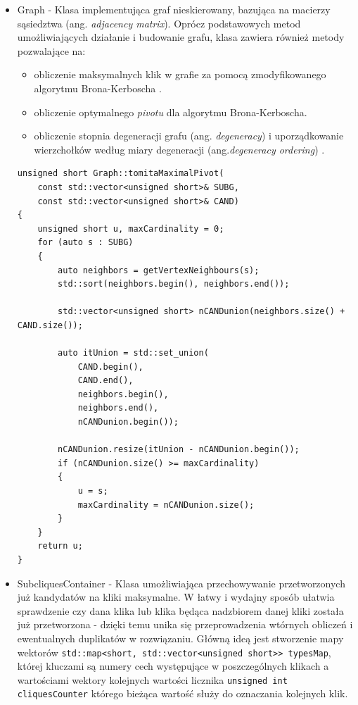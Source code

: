 \documentclass[12pt]{article}
\def\inline{\lstinline[basicstyle=\ttfamily,keywordstyle={}]}
\begin{document}
\begin{itemize}
\item Graph - Klasa implementująca graf nieskierowany, bazująca na macierzy sąsiedztwa (ang. \textit{adjacency matrix}). Oprócz podstawowych metod umożliwiających działanie i budowanie grafu, klasa zawiera również metody pozwalające na:

\begin{itemize}
\item obliczenie maksymalnych klik w grafie za pomocą zmodyfikowanego algorytmu Brona-Kerboscha \cite{chinczyki}.
\item obliczenie optymalnego \textit{pivotu} \cite{pivot} dla algorytmu Brona-Kerboscha.
\item obliczenie stopnia degeneracji grafu (ang. \textit{degeneracy}) i uporządkowanie wierzchołków według miary degeneracji (ang.\textit{degeneracy ordering}) \cite{degenerat}.
\end{itemize}

\begin{minipage}{\linewidth}
\begin{lstlisting}[caption={Kod metody tomitaMaximalPivot umożliwiającej wyliczenie optymalnego punktu \textit{pivot}}]
unsigned short Graph::tomitaMaximalPivot(
	const std::vector<unsigned short>& SUBG,
    const std::vector<unsigned short>& CAND)
{
	unsigned short u, maxCardinality = 0;
	for (auto s : SUBG)
	{
		auto neighbors = getVertexNeighbours(s);
		std::sort(neighbors.begin(), neighbors.end());

		std::vector<unsigned short> nCANDunion(neighbors.size() + CAND.size());

		auto itUnion = std::set_union(
        	CAND.begin(),
            CAND.end(),
            neighbors.begin(),
            neighbors.end(),
            nCANDunion.begin());

		nCANDunion.resize(itUnion - nCANDunion.begin());
		if (nCANDunion.size() >= maxCardinality)
		{
			u = s;
			maxCardinality = nCANDunion.size();
		}
	}
	return u;
}
\end{lstlisting}
\end{minipage}

\item SubcliquesContainer - Klasa umożliwiająca przechowywanie przetworzonych już kandydatów na kliki maksymalne. W łatwy i wydajny sposób ułatwia sprawdzenie czy dana klika lub klika będąca nadzbiorem danej kliki została już przetworzona - dzięki temu unika się przeprowadzenia wtórnych obliczeń i ewentualnych duplikatów w rozwiązaniu. Główną ideą jest stworzenie mapy wektorów \inline{std::map<short, std::vector<unsigned short>> typesMap}, której kluczami są numery cech występujące w poszczególnych klikach a wartościami wektory kolejnych wartości licznika \inline{unsigned int cliquesCounter} którego bieżąca wartość służy do oznaczania kolejnych klik.


\end{itemize}
\end{document}

